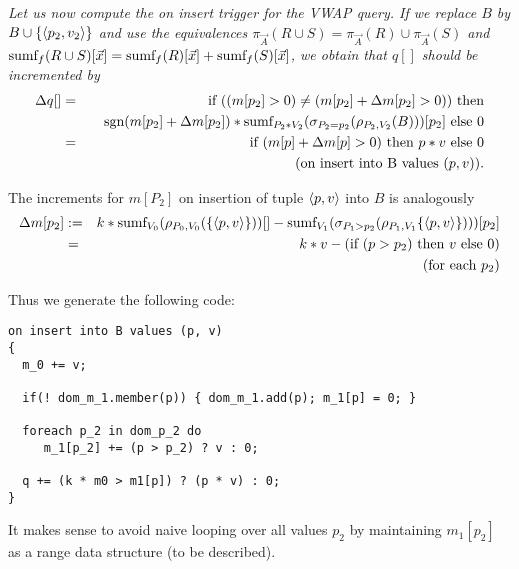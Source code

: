 \punto




\begin{example}\em
Let us now compute the on insert trigger for the VWAP query.
If we replace $B$ by $B \cup \{{\langle p_2,v_2\rangle}\}$ and use the equivalences
$\pi_{\vec{A}}(R \cup S) = \pi_{\vec{A}}(R) \cup \pi_{\vec{A}}(S)$ and
$\mbox{sumf}_f(R \cup S)[\vec{x}] =
\mbox{sumf}_f(R)[\vec{x}] + \mbox{sumf}_f(S)[\vec{x}]$, we obtain
that $q[]$ should be incremented by
%
\begin{eqnarray*}
\Delta q[] &=&
%
\mbox{if ($(m[p_2] > 0) \neq (m[p_2] + \Delta m[p_2] > 0))$ then}
\\
&& ~~~
      \mbox{$\mbox{sgn}(m[p_2] + \Delta m[p_2]) * \algsumf_{P_2 * V_2}(\sigma_{P_2=p_2}(\rho_{P_2,V_2}(B)))[p_2]$ else 0}
\\
&=&
\mbox{if $(m[p] + \Delta m[p] > 0)$ then $p * v$ else $0$}
\\
&& (\mbox{on insert into B values ($p, v$)}).
\end{eqnarray*}

The increments for $m[P_2]$ on insertion of tuple ${\langle p,v\rangle}$ into $B$ is
analogously
\begin{eqnarray*}
\Delta m[p_2] &:=&
k * \mbox{sumf}_{V_0}(\rho_{P_0, V_0}(\{{\langle p, v\rangle}\}))[] -
\mbox{sumf}_{V_1}(\sigma_{P_1 > p_2}(\rho_{P_1, V_1}\{{\langle p, v\rangle}\})))[p_2]
\\
&=& k * v - (\mbox{if $(p > p_2)$ then $v$ else $0$)}
\\
&& (\mbox{for each $p_2$})
\end{eqnarray*}

Thus we generate the following code:
\begin{verbatim}
on insert into B values (p, v)
{
  m_0 += v;

  if(! dom_m_1.member(p)) { dom_m_1.add(p); m_1[p] = 0; }

  foreach p_2 in dom_p_2 do
     m_1[p_2] += (p > p_2) ? v : 0;

  q += (k * m0 > m1[p]) ? (p * v) : 0;
}
\end{verbatim}


It makes sense to avoid naive looping over all values $p_2$ by maintaining
$m_1[p_2]$ as a range data structure (to be described).
\punto
\end{example}








